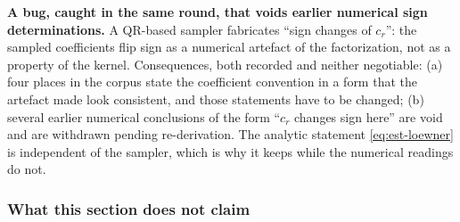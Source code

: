 \begin{warnbox}
\textbf{A bug, caught in the same round, that voids earlier numerical sign determinations.} A
QR-based sampler fabricates ``sign changes of $c_r$'': the sampled coefficients flip sign as a
numerical artefact of the factorization, not as a property of the kernel. Consequences, both
recorded and neither negotiable: (a) four places in the corpus state the coefficient convention in a
form that the artefact made look consistent, and those statements have to be changed; (b) several
earlier numerical conclusions of the form ``$c_r$ changes sign here'' are void and are withdrawn
pending re-derivation. The analytic statement \eqref{eq:est-loewner} is independent of the sampler,
which is why it keeps \LT{} while the numerical readings do not.
\end{warnbox}

\subsubsection*{What this section does not claim}

